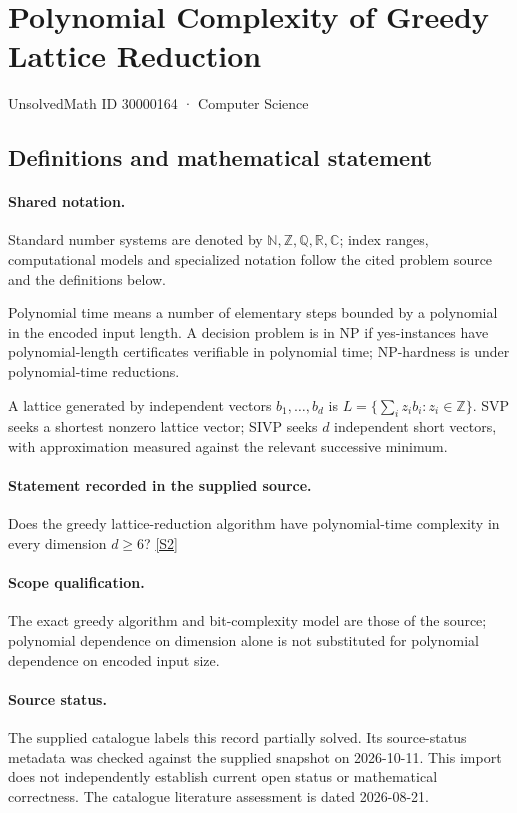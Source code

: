 \documentclass[11pt]{article}
\newcommand{\sref}[2]{\hyperlink{source:#1:#2}{[S#2]}}
\begin{document}
\setcounter{section}{30000163}
\section{Polynomial Complexity of Greedy Lattice Reduction}\label{30000164}
{\small\sffamily UnsolvedMath ID 30000164 · Computer Science}
\subsection{Definitions and mathematical statement}

\paragraph{Shared notation.}Standard number systems are denoted by $\mathbb N,\mathbb Z,\mathbb Q,\mathbb R,\mathbb C$; index ranges, computational models and specialized notation follow the cited problem source and the definitions below.


Polynomial time means a number of elementary steps bounded by a polynomial in the encoded input length. A decision problem is in $\mathrm{NP}$ if yes-instances have polynomial-length certificates verifiable in polynomial time; NP-hardness is under polynomial-time reductions.

A lattice generated by independent vectors $b_1,\ldots,b_d$ is $L=\{\sum_i z_i b_i:z_i\in\mathbb Z\}$. SVP seeks a shortest nonzero lattice vector; SIVP seeks $d$ independent short vectors, with approximation measured against the relevant successive minimum.
\paragraph{Statement recorded in the supplied source.}
Does the greedy lattice-reduction algorithm have polynomial-time complexity in every dimension $d\geq6$? \sref{30000164}{2}
\paragraph{Scope qualification.}
The exact greedy algorithm and bit-complexity model are those of the source; polynomial dependence on dimension alone is not substituted for polynomial dependence on encoded input size.
\paragraph{Source status.}
The supplied catalogue labels this record partially solved. Its source-status metadata was checked against the supplied snapshot on 2026-10-11. This import does not independently establish current open status or mathematical correctness. The catalogue literature assessment is dated 2026-08-21.
\end{document}
